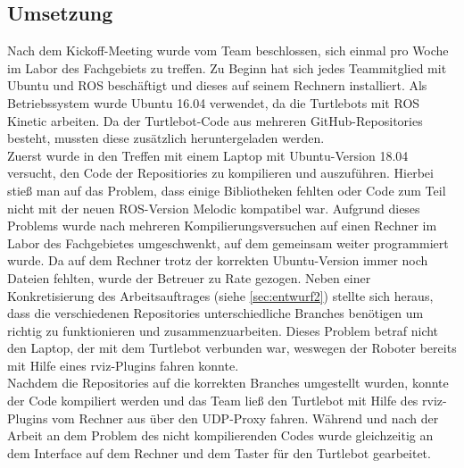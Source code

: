 \documentclass[a4paper,12pt,headsepline]{scrartcl}
\begin{document}
		
	\subsection{Umsetzung}
		Nach dem Kickoff-Meeting wurde vom Team beschlossen, sich einmal pro Woche im Labor des Fachgebiets zu treffen. Zu Beginn hat sich jedes Teammitglied mit Ubuntu und ROS beschäftigt und dieses auf seinem Rechnern installiert. Als Betriebssystem wurde Ubuntu 16.04 verwendet, da die Turtlebots mit ROS Kinetic arbeiten. Da der Turtlebot-Code aus mehreren GitHub-Repositories besteht, mussten diese zusätzlich heruntergeladen werden.\\
		Zuerst wurde in den Treffen mit einem Laptop mit Ubuntu-Version 18.04 versucht, den Code der Repositiories zu kompilieren und auszuführen. Hierbei stieß man auf das Problem, dass einige Bibliotheken fehlten oder Code zum Teil nicht mit der neuen ROS-Version Melodic kompatibel war. Aufgrund dieses Problems wurde nach mehreren Kompilierungsversuchen auf einen Rechner im Labor des Fachgebietes umgeschwenkt, auf dem gemeinsam weiter programmiert wurde. Da auf dem Rechner trotz der korrekten Ubuntu-Version immer noch Dateien fehlten, wurde der Betreuer zu Rate gezogen. Neben einer Konkretisierung des Arbeitsauftrages (siehe \cref{sec:entwurf2}) stellte sich heraus, dass die verschiedenen Repositories unterschiedliche Branches benötigen um richtig zu funktionieren und zusammenzuarbeiten. Dieses Problem betraf nicht den Laptop, der mit dem Turtlebot verbunden war, weswegen der Roboter bereits mit Hilfe eines rviz-Plugins fahren konnte.\\
		Nachdem die Repositories auf die korrekten Branches umgestellt wurden, konnte der Code kompiliert werden und das Team ließ den Turtlebot mit Hilfe des rviz-Plugins vom Rechner aus über den UDP-Proxy fahren. Während und nach der Arbeit an dem Problem des nicht kompilierenden Codes wurde gleichzeitig an dem Interface auf dem Rechner und dem Taster für den Turtlebot gearbeitet.
%
\end{document}

